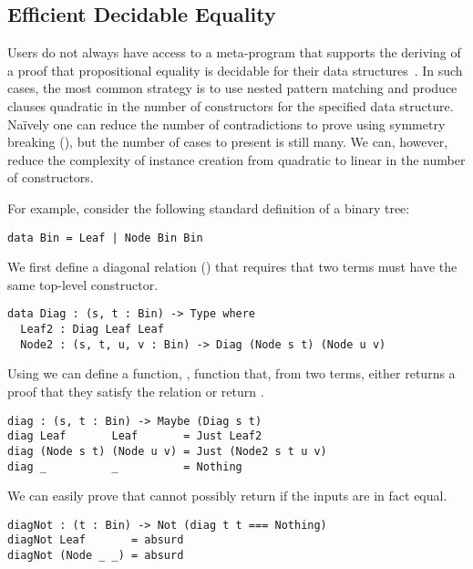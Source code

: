 \subsection{Efficient Decidable Equality}
\label{sec:idioms:decEq}

Users do not always have access to a meta-program that supports the deriving of a proof that propositional equality is decidable for their data structures~\cite{DBLP:conf/icfp/ChristiansenB16}.
%
In such cases, the most common strategy is to use nested pattern matching and produce
clauses quadratic in the number of constructors for the specified data structure.
%
Na{\"i}vely one can reduce the number of contradictions to prove using symmetry breaking (), but the number of cases to present is still many.
%
We can, however, reduce the complexity of  instance creation from quadratic to linear in the number of constructors.
%

For example, consider the following standard definition of a binary tree:

\begin{Verbatim}
data Bin = Leaf | Node Bin Bin
\end{Verbatim}

\noindent
We first define a diagonal relation () that requires that two terms must have the same top-level constructor.

\begin{Verbatim}
data Diag : (s, t : Bin) -> Type where
  Leaf2 : Diag Leaf Leaf
  Node2 : (s, t, u, v : Bin) -> Diag (Node s t) (Node u v)
\end{Verbatim}

\noindent
Using  we can define a function, , function that, from two terms, either returns a proof that they satisfy the  relation or return .

\begin{Verbatim}
diag : (s, t : Bin) -> Maybe (Diag s t)
diag Leaf       Leaf       = Just Leaf2
diag (Node s t) (Node u v) = Just (Node2 s t u v)
diag _          _          = Nothing
\end{Verbatim}

\noindent
We can easily prove that  cannot possibly return  if the inputs are in fact equal.

\begin{Verbatim}
diagNot : (t : Bin) -> Not (diag t t === Nothing)
diagNot Leaf       = absurd
diagNot (Node _ _) = absurd
\end{Verbatim}


